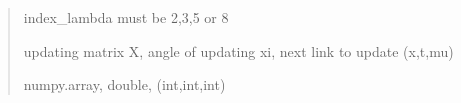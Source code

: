 \documentclass[letterpaper,10pt,english]{sphinxmanual}
\begin{document}
\begin{fulllineitems}
\begin{quote}
\begin{description}
\begin{itemize}
\end{itemize}

\sphinxAtStartPar
{} \textendash{} index\_lambda must be 2,3,5 or 8

\sphinxAtStartPar
updating matrix X, angle of updating xi, next link to update (x,t,mu)

\sphinxAtStartPar
numpy.array, double, (int,int,int)

\end{description}\end{quote}

\end{fulllineitems}

\end{document}
